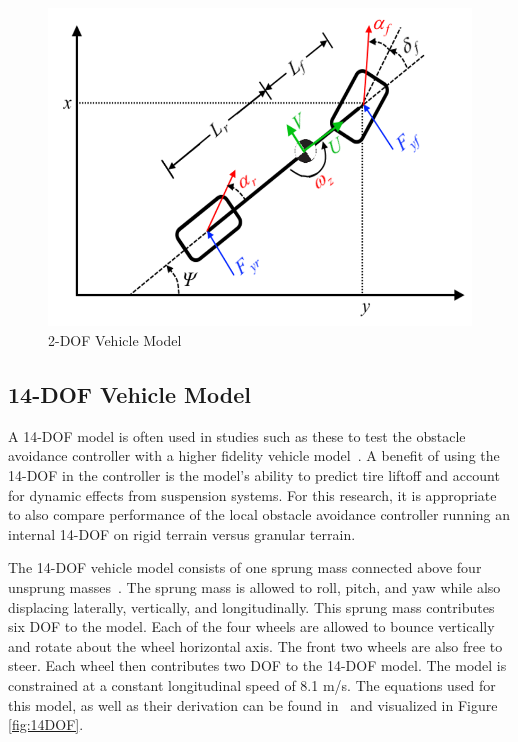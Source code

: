 \documentclass[12pt,onecolumn]{report}
\begin{document}
\begin{figure}
	\centering
	\includegraphics[width=0.8\columnwidth]{Figs/2DOF_haraus.png}
	\caption{\small 2-DOF Vehicle Model}  
	\label{fig:2DOF}
\end{figure}


\subsection{14-DOF Vehicle Model}\label{ss:14DOFModel}
A 14-DOF model is often used in studies such as these to test the obstacle avoidance controller with a higher fidelity vehicle model~\cite{ModelFidelity2013, ModelFidelity2016}. A benefit of using the 14-DOF in the controller is the model's ability to predict tire liftoff and account for dynamic effects from suspension systems. For this research, it is appropriate to also compare performance of the local obstacle avoidance controller running an internal 14-DOF on rigid terrain versus granular terrain.  

The 14-DOF vehicle model consists of one sprung mass connected above four unsprung masses~\cite{RollStudies2007}. The sprung mass is allowed to roll, pitch, and yaw while also displacing laterally, vertically, and longitudinally. This sprung mass contributes six DOF to the model. Each of the four wheels are allowed to bounce vertically and rotate about the wheel horizontal axis. The front two wheels are also free to steer. Each wheel then contributes two DOF to the 14-DOF model. The model is constrained at a constant longitudinal speed of 8.1 m/s. The equations used for this model, as well as their derivation can be found in~\cite{RollStudies2007} and visualized in Figure \ref{fig:14DOF}.
\end{document}
